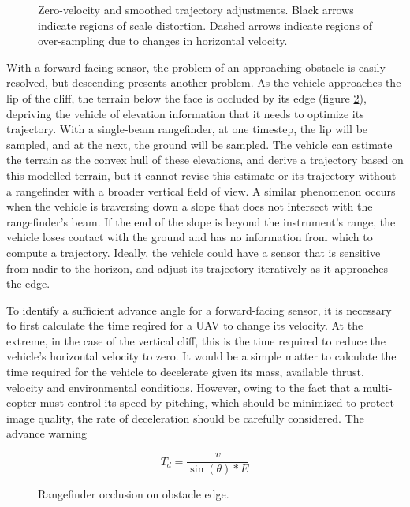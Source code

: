 \documentclass[10pt,a4paper]{report}
\begin{document}
\begin{figure}
\centering
\def\svgscale{0.5}

\caption{Zero-velocity and smoothed trajectory adjustments. Black arrows indicate regions of scale distortion. Dashed arrows indicate regions of over-sampling due to changes in horizontal velocity.}
\label{fig:uav_smooth_traj}
\end{figure}

With a forward-facing sensor, the problem of an approaching obstacle is easily resolved, but descending presents another problem. As the vehicle approaches the lip of the cliff, the terrain below the face is occluded by its edge (figure \ref{fig:uav_edge_occlude}), depriving the vehicle of elevation information that it needs to optimize its trajectory. With a single-beam rangefinder, at one timestep, the lip will be sampled, and at the next, the ground will be sampled. The vehicle can estimate the terrain as the convex hull of these elevations, and derive a trajectory based on this modelled terrain, but it cannot revise this estimate or its trajectory without a rangefinder with a broader vertical field of view. A similar phenomenon occurs when the vehicle is traversing down a slope that does not intersect with the rangefinder's beam. If the end of the slope is beyond the instrument's range, the vehicle loses contact with the ground and has no information from which to compute a trajectory.  Ideally, the vehicle could have a sensor that is sensitive from nadir to the horizon, and adjust its trajectory iteratively as it approaches the edge. 

To identify a sufficient advance angle for a forward-facing sensor, it is necessary to first calculate the time reqired for a UAV to change its velocity. At the extreme, in the case of the vertical cliff, this is the time required to reduce the vehicle's horizontal velocity to zero. It would be a simple matter to calculate the time required for the vehicle to decelerate given its mass, available thrust, velocity and environmental conditions. However, owing to the fact that a multi-copter must control its speed by pitching, which should be minimized to protect image quality, the rate of deceleration should be carefully considered. The advance warning

\begin{equation}
T_d = \dfrac{v}{\sin(\theta) * E}
\label{eq:decel}
\end{equation} 

\begin{figure}
\centering
\def\svgscale{0.8}

\caption{Rangefinder occlusion on obstacle edge.}
\label{fig:uav_edge_occlude}
\end{figure}
\end{document}
